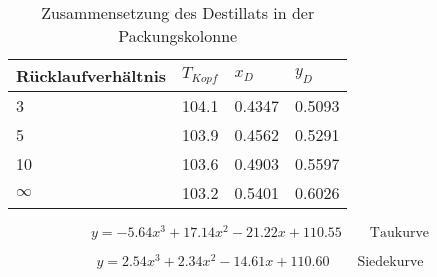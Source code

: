\documentclass{article}
\begin{document}
\begin{table}[ht!]
  \centering
 \begin{tabularx}{\textwidth}{XXXX}
Rücklaufverhältnis & $T_{Kopf}$ & $x_D$ & $y_D$  \\
\hline
\rowcolor{LightCyan}
3         & 104.1  &  0.4347 & 0.5093   \\
5         & 103.9  &  0.4562 & 0.5291   \\
\rowcolor{LightCyan}
10        & 103.6  &  0.4903 & 0.5597   \\
$\infty$  & 103.2  &  0.5401 & 0.6026  \\
\end{tabularx}
  \caption{Zusammensetzung des Destillats in der Packungskolonne}
\end{table}



\begin{equation}
y = -5.64 x ^ 3 + 17.14 x ^2 - 21.22 x + 110.55
\qquad \text{Taukurve}
\end{equation}

\begin{equation}
y = 2.54 x ^ 3 + 2.34 x ^2 - 14.61 x + 110.60
\qquad \text{Siedekurve}
\end{equation}
\end{document}
